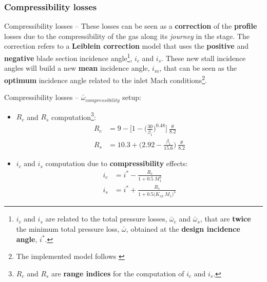 \subsubsection{Compressibility losses}
	{\nologo
	\begin{frame}{Compressibility losses -- }
		 These losses can be seen as a \textbf{correction} of the \textbf{profile} losses due to the compressibility of the gas along its \textit{journey} in the stage. 
		 \newline
		 \newline
		 The correction refers to a \textbf{Leiblein correction} model that uses the \textbf{positive} and \textbf{negative} blade section incidence angle\footnote{$i_c$ and $i_s$ are related to the total pressure losses, $\bar{\omega}_c$ and $\bar{\omega}_s$, that are \textbf{twice} the minimum total pressure loss, $\bar{\omega}$, obtained at the \textbf{design incidence angle}, $i^*$.}, $i_c$ and $i_s$. 
		 \newline
		 \newline
		 These new stall incidence angles will build a new \textbf{mean} incidence angle, $i_m$, that can be seen as the \textbf{optimum} incidence angle related to the inlet Mach conditions\footnote{The implemented model follows \cite[Sec. 6.6]{axial2004}}. 
	\end{frame}
	}
	\begin{frame}{Compressibility losses -- }
		$\bar{\omega}_{compressibility}$ setup:
		\begin{itemize}
			\item $R_c$ and $R_s$ computation\footnote{$R_{c}$ and $R_{s}$ are \textbf{range indices} for the computation of $i_c$ and $i_s$.}:
				\begin{align}
					R_c & = 9 - \Bigg[1 - \Bigg( \frac{30}{\beta_1} \Bigg)^{0.48} \Bigg] \ \frac{\theta}{8.2} \nonumber \\
					R_s & = 10.3 + \Bigg( 2.92 - \frac{\beta_1}{15.6} \Bigg) \ \frac{\theta}{8.2} \nonumber  
				\end{align}
			\item $i_c$ and $i_s$ computation due to \textbf{compressibility} effects:
				\begin{align}
					i_c & = i^{*} - \frac{R_c}{1 + 0.5 \ M_{1}^{3}} \nonumber \\
					i_s & = i^{*} + \frac{R_s}{1 + 0.5 \Big( K_{sh} \ M_{1} \Big)^3} \nonumber 
				\end{align}
		\end{itemize}
	\end{frame}

